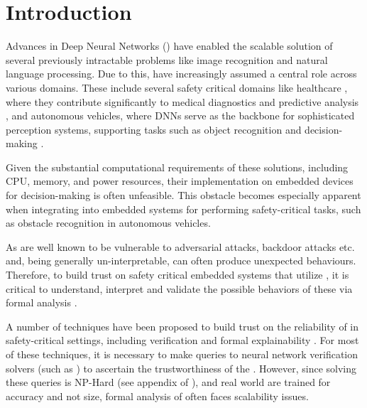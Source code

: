 
\section{Introduction}


Advances in Deep Neural Networks (\dnn) have enabled the scalable solution
of several previously intractable problems like image recognition and natural
language processing. Due to this, \dnn have increasingly assumed a central
role across various domains. These include several safety critical domains like
healthcare \cite{b1}, where they contribute significantly to medical diagnostics
and predictive analysis \cite{b2}, and autonomous vehicles, where DNNs serve as
the backbone for sophisticated perception systems, supporting tasks such as
object recognition and decision-making \cite{b3}. 

Given the substantial computational requirements of these \dnn solutions, 
including CPU, memory, and power resources, their implementation on embedded 
devices for decision-making is often unfeasible. 
This obstacle becomes especially apparent when integrating \dnn into 
embedded systems for performing safety-critical tasks, such as obstacle 
recognition in autonomous vehicles.

As \dnn are well known to be vulnerable to adversarial
attacks\cite{l-bfgs, fgsm, deep-fool, pgd, ground-truth-adv-attack, cw-attack},
backdoor attacks \cite{backdoor-poisoning} etc.  and, being generally
un-interpretable, can often produce 
unexpected behaviours. Therefore, to build trust on safety critical embedded systems 
that utilize \dnn, it is  critical to understand, interpret 
and validate the possible behaviors of these \dnn via formal analysis
\cite{overview-fxai, minimal-image-fxai, backdoor-verification, nn-lander-verif,
camera-verif-dsouza, generalization-verif}.

A number of techniques have been proposed to build trust on the reliability
of \dnn in safety-critical settings, including verification \cite{reluplex,
deeppoly, crown, beta-crown, cegar-nn}  and formal
explainability \cite{overview-fxai, minimal-image-fxai}. For most of these
techniques, it is necessary to make queries to neural
network verification solvers (such as \cite{reluplex, beta-crown}) to ascertain
the trustworthiness of the \dnn.
 However, since solving these queries is NP-Hard (see appendix of
\cite{reluplex}), and real world \dnn are trained for accuracy and not 
size, formal analysis of \dnn often faces scalability issues.

